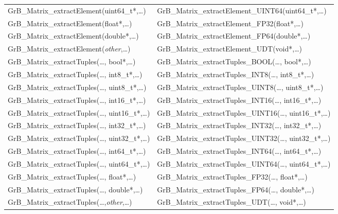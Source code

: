 \begin{table}[htb]
{\begin{tabular}{l|l}
{\sf GrB\_Matrix\_extractElement(uint64\_t*,\ldots)}		& {\sf GrB\_Matrix\_extractElement\_UINT64(uint64\_t*,\ldots)} \\
{\sf GrB\_Matrix\_extractElement(float*,\ldots)}		& {\sf GrB\_Matrix\_extractElement\_FP32(float*,\ldots)} \\
{\sf GrB\_Matrix\_extractElement(double*,\ldots)}		& {\sf GrB\_Matrix\_extractElement\_FP64(double*,\ldots)} \\
{\sf GrB\_Matrix\_extractElement(\emph{other},\ldots)}		& {\sf GrB\_Matrix\_extractElement\_UDT(void*,\ldots)} \\ \hline
{\sf GrB\_Matrix\_extractTuples(\ldots, bool*,\ldots)}		& {\sf GrB\_Matrix\_extractTuples\_BOOL(\ldots, bool*,\ldots)} \\
{\sf GrB\_Matrix\_extractTuples(\ldots, int8\_t*,\ldots)}	& {\sf GrB\_Matrix\_extractTuples\_INT8(\ldots, int8\_t*,\ldots)} \\
{\sf GrB\_Matrix\_extractTuples(\ldots, uint8\_t*,\ldots)}	& {\sf GrB\_Matrix\_extractTuples\_UINT8(\ldots, uint8\_t*,\ldots)} \\
{\sf GrB\_Matrix\_extractTuples(\ldots, int16\_t*,\ldots)}	& {\sf GrB\_Matrix\_extractTuples\_INT16(\ldots, int16\_t*,\ldots)} \\
{\sf GrB\_Matrix\_extractTuples(\ldots, uint16\_t*,\ldots)}	& {\sf GrB\_Matrix\_extractTuples\_UINT16(\ldots, uint16\_t*,\ldots)} \\
{\sf GrB\_Matrix\_extractTuples(\ldots, int32\_t*,\ldots)}	& {\sf GrB\_Matrix\_extractTuples\_INT32(\ldots, int32\_t*,\ldots)} \\
{\sf GrB\_Matrix\_extractTuples(\ldots, uint32\_t*,\ldots)}	& {\sf GrB\_Matrix\_extractTuples\_UINT32(\ldots, uint32\_t*,\ldots)} \\
{\sf GrB\_Matrix\_extractTuples(\ldots, int64\_t*,\ldots)}	& {\sf GrB\_Matrix\_extractTuples\_INT64(\ldots, int64\_t*,\ldots)} \\
{\sf GrB\_Matrix\_extractTuples(\ldots, uint64\_t*,\ldots)}	& {\sf GrB\_Matrix\_extractTuples\_UINT64(\ldots, uint64\_t*,\ldots)} \\
{\sf GrB\_Matrix\_extractTuples(\ldots, float*,\ldots)}		& {\sf GrB\_Matrix\_extractTuples\_FP32(\ldots, float*,\ldots)} \\
{\sf GrB\_Matrix\_extractTuples(\ldots, double*,\ldots)}	& {\sf GrB\_Matrix\_extractTuples\_FP64(\ldots, double*,\ldots)} \\
{\sf GrB\_Matrix\_extractTuples(\ldots,\emph{other},\ldots)}	& {\sf GrB\_Matrix\_extractTuples\_UDT(\ldots, void*,\ldots)} \\ \hline
\end{tabular}
}
\label{Tab:NonPolymorphic3}
\end{table}

